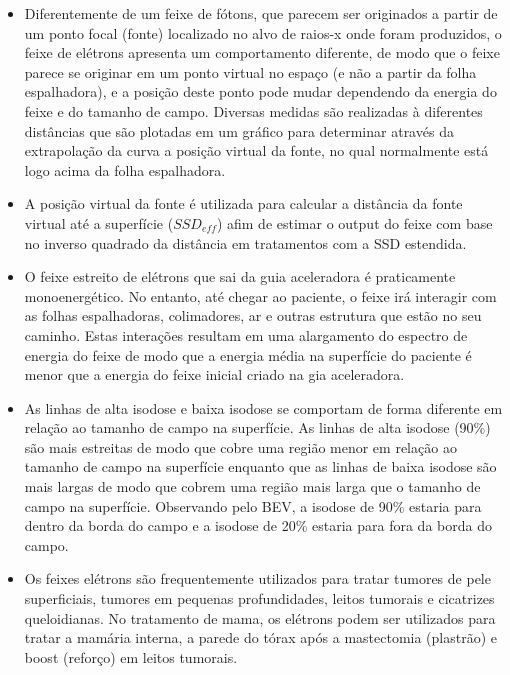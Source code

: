 \documentclass[11pt,a4paper]{article}
\newcounter{exemplo}
\begin{document}
\begin{exemplo}
\begin{itemize}
        
        \item Diferentemente de um feixe de fótons, que parecem ser originados a partir de um ponto focal (fonte) localizado no alvo de raios-x onde foram produzidos, o feixe de elétrons apresenta um comportamento diferente, de modo que o feixe parece se originar em um ponto virtual no espaço (e não a partir da folha espalhadora), e a posição deste ponto pode mudar dependendo da energia do feixe e do tamanho de campo. Diversas medidas são realizadas à diferentes distâncias que são plotadas em um gráfico para determinar através da extrapolação da curva a posição virtual da fonte, no qual normalmente está logo acima da folha espalhadora. 
        
        \item A posição virtual da fonte é utilizada para calcular a distância da fonte virtual até a superfície ($SSD_{eff}$) afim de estimar o output do feixe com base no inverso quadrado da distância em tratamentos com a SSD estendida. 
        
        \item O feixe estreito de elétrons que sai da guia aceleradora é praticamente monoenergético. No entanto, até chegar ao paciente, o feixe irá interagir com as folhas espalhadoras, colimadores, ar e outras estrutura que estão no seu caminho. Estas interações resultam em uma alargamento do espectro de energia do feixe de modo que a energia média na superfície do paciente é menor que a energia do feixe inicial criado na gia aceleradora.
        
        \item As linhas de alta isodose e baixa isodose se comportam de forma diferente em relação ao tamanho de campo na superfície. As linhas de alta isodose (90\%) são mais estreitas de modo que cobre uma região menor em relação ao tamanho de campo na superfície enquanto que as linhas de baixa isodose são mais largas de modo que cobrem uma região mais larga que o tamanho de campo na superfície. Observando pelo BEV, a isodose de 90\% estaria para dentro da borda do campo e a isodose de 20\% estaria para fora da borda do campo. 
        
        \item Os feixes elétrons são frequentemente utilizados para tratar tumores de pele superficiais, tumores em pequenas profundidades, leitos tumorais e cicatrizes queloidianas. No tratamento de mama, os elétrons podem ser utilizados para tratar a mamária interna, a parede do tórax após a mastectomia (plastrão) e boost (reforço) em leitos tumorais.
        


\end{itemize}
\end{exemplo}
\end{document}
